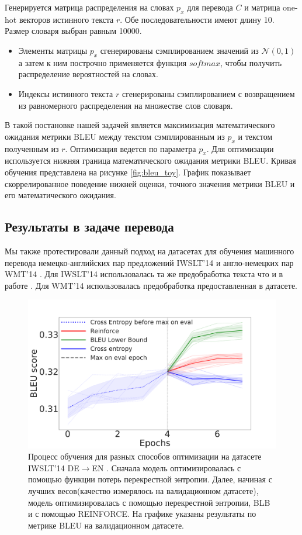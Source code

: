 \documentclass[14pt, a4paper]{extarticle}
\begin{document}
Генерируется матрица распределения на словах $p_x$ для перевода $C$ и матрица one-hot векторов истинного текста $r$. Обе последовательности имеют длину 10. Размер словаря выбран равным 10000.
\begin{itemize}
  \item Элементы матрицы $p_x$ сгенерированы сэмплированием значений из $\mathcal{N} (0,1)$ а затем к ним построчно применяется функция $softmax$, чтобы получить распределение вероятностей на словах.
  \item Индексы истинного текста $r$ сгенерированы сэмплированием с возвращением из равномерного распределения на множестве слов словаря.
\end{itemize}
В такой постановке нашей задачей является максимизация математического ожидания метрики BLEU между текстом сэмплированным из $p_x$ и текстом полученным из $r$. Оптимизация ведется по параметра $p_x$. Для оптимизации используется нижняя граница математического ожидания метрики BLEU.
Кривая обучения представлена на рисунке \ref{fig:bleu_toy}. График показывает скоррелированное поведение нижней оценки, точного значения метрики BLEU и его математического ожидания.

\subsection{Результаты в задаче перевода}
Мы также протестировали данный подход на датасетах для обучения машинного перевода немецко-английских пар предложений IWSLT'14 \cite{iwslt14} и англо-немецких пар WMT'14 \cite{wmt14}. Для IWSLT'14 использовалась та же предобработка текста что и в работе \cite{bso}. Для WMT'14 использовалась  предобработка предоставленная в датасете.

\begin{figure}[h]
  \centering
  \includegraphics[scale=0.28]{res.pdf}
  \caption{Процесс обучения для разных способов оптимизации на  датасете IWSLT'14 DE$\rightarrow$EN \cite{iwslt14}. Сначала модель оптимизировалась с помощью функции потерь перекрестной энтропии. Далее, начиная с лучших весов(качество измерялось на валидационном датасете), модель оптимизировалась с помощью  перекрестной энтропии, BLB и с помощью REINFORCE. На графике указаны результаты по метрике BLEU на валидационном датасете. }
  \label{fig:results}
\end{figure}
\end{document}

